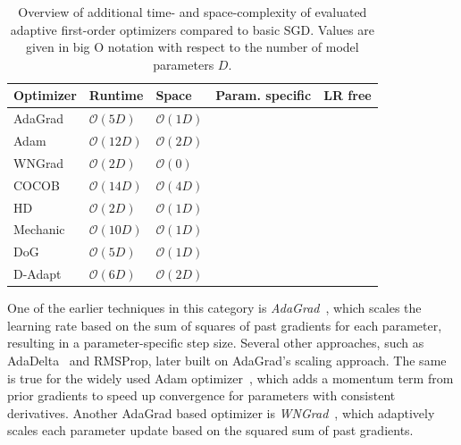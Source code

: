 \documentclass[runningheads]{llncs}
\newcommand{\cmark}{\ding{51}} %
\newcommand{\xmark}{\ding{55}} %
\begin{document}
\begin{table}[ht]
	\centering
	\scriptsize
	\caption{
		Overview of additional time- and space-complexity of evaluated adaptive first-order optimizers compared to basic SGD.
		Values are given in big O notation with respect to the number of model parameters $D$.
	}\label{tab:param_free_optims}
	\begin{tabular}{@{}lllcc@{}}
		\toprule
		Optimizer                & Runtime            & Space             & Param. specific & LR free \\ \midrule
		AdaGrad                  & $\mathcal{O}(5D)$  & $\mathcal{O}(1D)$ & \cmark          & \xmark  \\
		Adam                     & $\mathcal{O}(12D)$ & $\mathcal{O}(2D)$ & \cmark          & \xmark  \\
		WNGrad                   & $\mathcal{O}(2D)$  & $\mathcal{O}(0)$  & \xmark          & \xmark  \\
		COCOB                    & $\mathcal{O}(14D)$ & $\mathcal{O}(4D)$ & \cmark          & \cmark  \\
		HD\footnotemark[1]       & $\mathcal{O}(2D)$  & $\mathcal{O}(1D)$ & \xmark          & \xmark  \\
		Mechanic\footnotemark[1] & $\mathcal{O}(10D)$ & $\mathcal{O}(1D)$ & \cmark          & \cmark  \\
		DoG                      & $\mathcal{O}(5D)$  & $\mathcal{O}(1D)$ & \xmark          & \cmark  \\
		D-Adapt\footnotemark[1]  & $\mathcal{O}(6D)$  & $\mathcal{O}(2D)$ & \xmark          & \cmark  \\
		\bottomrule
	\end{tabular}
\end{table}

One of the earlier techniques in this category is \textit{AdaGrad}~\cite{duchiAdaptiveSubgradientMethods2011}, which scales the learning rate based on the sum of squares of past gradients for each parameter, resulting in a parameter-specific step size.
Several other approaches, such as AdaDelta~\cite{zeilerADADELTAAdaptiveLearning2012a} and RMSProp, later built on AdaGrad's scaling approach.
The same is true for the widely used Adam optimizer~\cite{kingmaAdamMethodStochastic2017b}, which adds a momentum term from prior gradients to speed up convergence for parameters with consistent derivatives.
Another AdaGrad based optimizer is \textit{WNGrad}~\cite{wuWNGradLearnLearning2020}, which adaptively scales each parameter update based on the squared sum of past gradients.
\end{document}
